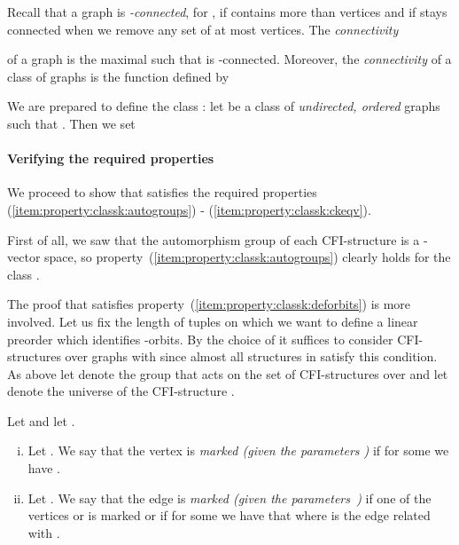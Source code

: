 \documentclass[a4paper,UKenglish]{lipics}
\theoremstyle{plain}
\begin{document}
\medskip
Recall that a graph  is \emph{-connected}, for , 
if  contains more than  vertices and if  stays connected 
when we remove any set of at most  vertices. The \emph{connectivity} 
 
of a graph  is the maximal  such that  is 
-connected.
Moreover, the \emph{connectivity}  of a class  of 
graphs is the function  defined by

We are prepared to define the class : 
let  be a class of \emph{undirected, ordered} graphs
such that . 
Then we set


\paragraph*{Verifying the required properties}
We proceed to show that  
satisfies the required properties
(\ref{item:property:classk:autogroups}) - 
(\ref{item:property:classk:ckeqv}).

First of all, we saw that the automorphism group of each CFI-structure 
 is a -vector space, so 
property~(\ref{item:property:classk:autogroups}) clearly holds for the class 
.

The proof that  satisfies property~(\ref{item:property:classk:deforbits}) 
is more involved.
Let us fix the length  of tuples on which we want to 
define a linear preorder which identifies -orbits.
By the choice of  it suffices to consider CFI-structures  over graphs  
with  since almost all structures in 
satisfy this condition.
As above let  denote the group that acts on the set 
of 
CFI-structures over  and let  denote 
the universe of the 
CFI-structure .

\begin{definition}
 Let  and let .

 \begin{enumerate}[(i)]
  \item Let . 
  We say that the vertex  is \emph{marked (given the parameters )} 
if for some  we have .
  \item Let . 
  We say that the edge  is \emph{marked (given the parameters~)} 
if one of the vertices  or  is marked or if for some  we have that  where  is the edge related with .
 \end{enumerate}
 \end{definition}
 
\end{document}
